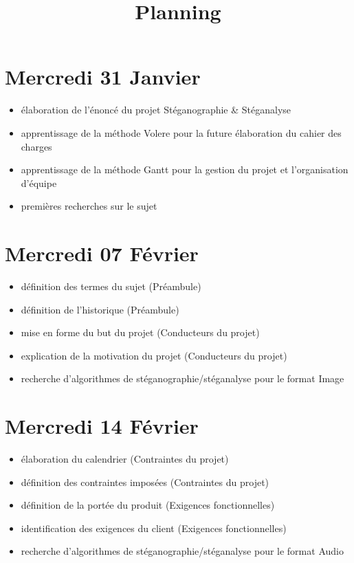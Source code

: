\documentclass[11pt]{article}
\title{Planning}
\begin{document}
\maketitle

\section{Mercredi 31 Janvier}
\begin {itemize}
\item élaboration de l'énoncé du projet Stéganographie \& Stéganalyse
\item apprentissage de la méthode Volere pour la future élaboration du cahier des charges
\item apprentissage de la méthode Gantt pour la gestion du projet et l'organisation d'équipe
\item premières recherches sur le sujet 
\end{itemize}

\section{Mercredi 07 Février}
\begin {itemize}
\item définition des termes du sujet (Préambule)
\item définition de l'historique (Préambule)
\item mise en forme du but du projet (Conducteurs du projet)
\item explication de la motivation du projet (Conducteurs du projet)
\item recherche d'algorithmes de stéganographie/stéganalyse pour le format Image 
\end{itemize}

\section{Mercredi 14 Février}
\begin {itemize}
\item élaboration du calendrier (Contraintes du projet)
\item définition des contraintes imposées (Contraintes du projet)
\item définition de la portée du produit (Exigences fonctionnelles)
\item identification des exigences du client (Exigences fonctionnelles)
\item recherche d'algorithmes de stéganographie/stéganalyse pour le format Audio
\end{itemize}
\end{document}
